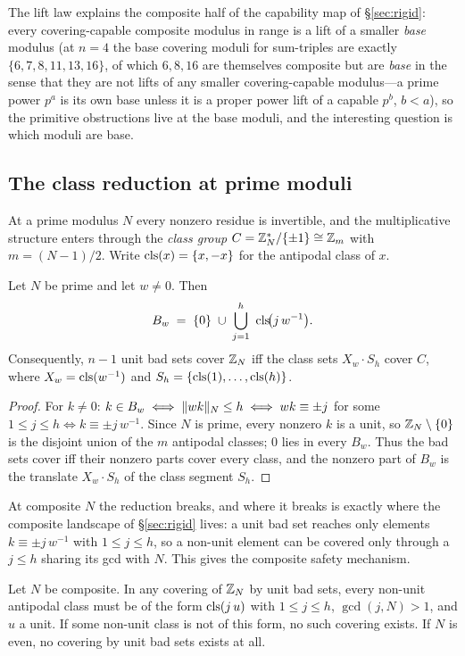 The lift law explains the composite half of the capability map of
\S\ref{sec:rigid}: every covering-capable composite modulus in range is a
lift of a smaller \emph{base} modulus (at $n=4$ the base covering moduli
for sum-triples are exactly $\{6,7,8,11,13,16\}$, of which $6,8,16$ are
themselves composite but are \emph{base} in the sense that they are not
lifts of any smaller covering-capable modulus---a prime power $p^a$ is its
own base unless it is a proper power lift of a capable $p^b$, $b<a$), so
the primitive obstructions live at the base moduli, and the interesting
question is which moduli are base.

\subsection{The class reduction at prime moduli}

At a prime modulus $N$ every nonzero residue is invertible, and the
multiplicative structure enters through the \emph{class group}
$C=\mathbb{Z}_N^\ast/\{\pm1\}\cong\mathbb{Z}_m$ with $m=(N-1)/2$. Write
$\operatorname{cls}(x)=\{x,-x\}$ for the antipodal class of $x$.

\begin{lemma}\label{lem:class}
Let $N$ be prime and let $w\ne 0$. Then
\[
B_w\;=\;\{0\}\;\cup\;\bigcup_{j=1}^{h}\ \cls\!\bigl(j\,w^{-1}\bigr).
\]
Consequently, $n-1$ unit bad sets cover $\mathbb{Z}_N$ iff the class sets
$X_w\cdot S_h$ cover $C$, where $X_w=\operatorname{cls}(w^{-1})$ and
$S_h=\{\operatorname{cls}(1),\dots,\operatorname{cls}(h)\}$.
\end{lemma}

\begin{proof}
For $k\ne 0$: $k\in B_w\iff \lVert wk \rVert_{N}\le h\iff wk\equiv \pm j$ for some
$1\le j\le h\iff k\equiv \pm j\,w^{-1}$. Since $N$ is prime, every nonzero
$k$ is a unit, so $\mathbb{Z}_N\setminus\{0\}$ is the disjoint union of the $m$
antipodal classes; $0$ lies in every $B_w$. Thus the bad sets cover iff
their nonzero parts cover every class, and the nonzero part of $B_w$ is
the translate $X_w\cdot S_h$ of the class segment $S_h$.
\end{proof}

At composite $N$ the reduction breaks, and where it breaks is exactly
where the composite landscape of \S\ref{sec:rigid} lives: a unit bad set
reaches only elements $k\equiv\pm j\,w^{-1}$ with $1\le j\le h$, so a
non-unit element can be covered only through a $j\le h$ sharing its gcd
with $N$. This gives the composite safety mechanism.

\begin{proposition}\label{prop:reach}
Let $N$ be composite. In any covering of $\mathbb{Z}_N$ by unit bad sets, every
non-unit antipodal class must be of the form $\operatorname{cls}(j\,u)$ with
$1\le j\le h$, $\gcd(j,N)>1$, and $u$ a unit. If some non-unit class is
not of this form, no such covering exists. If $N$ is even, no covering by
unit bad sets exists at all.
\end{proposition}

